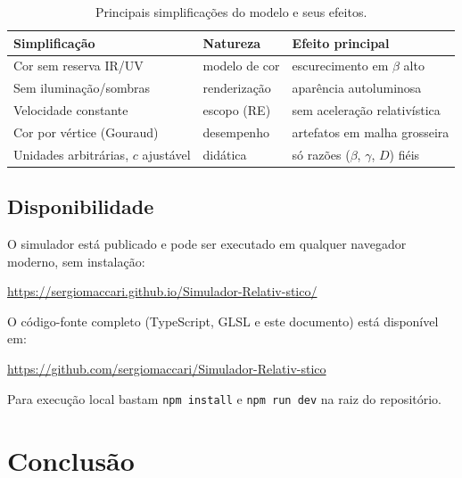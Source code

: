 \documentclass[10pt,a4paper,twocolumn]{article}
\begin{document}
\begin{table}[t]
  \centering
  \caption{Principais simplificações do modelo e seus efeitos.}
  \label{tab:limitacoes}
  \footnotesize
  \setlength{\tabcolsep}{3pt}
  \begin{tabular}{@{}>{\raggedright\arraybackslash}p{}%
                     >{\raggedright\arraybackslash}p{}%
                     >{\raggedright\arraybackslash}p{}@{}}
    \toprule
    Simplificação & Natureza & Efeito principal \\
    \midrule
    Cor sem reserva IR/UV     & modelo de cor  & escurecimento em $\beta$ alto \\
    Sem iluminação/sombras    & renderização   & aparência autoluminosa \\
    Velocidade constante      & escopo (RE)    & sem aceleração relativística \\
    Cor por vértice (Gouraud) & desempenho     & artefatos em malha grosseira \\
    Unidades arbitrárias, $c$ ajustável & didática & só razões ($\beta$, $\gamma$, $D$) fiéis \\
    \bottomrule
  \end{tabular}
\end{table}

\subsection{Disponibilidade}

O simulador está publicado e pode ser executado em qualquer navegador moderno, sem
instalação:
\begin{center}\small
  \url{https://sergiomaccari.github.io/Simulador-Relativ-stico/}
\end{center}
O código-fonte completo (TypeScript, GLSL e este documento) está disponível em:
\begin{center}\small
  \url{https://github.com/sergiomaccari/Simulador-Relativ-stico}
\end{center}
Para execução local bastam \texttt{npm install} e \texttt{npm run dev} na raiz do
repositório.

\section{Conclusão}
\end{document}
